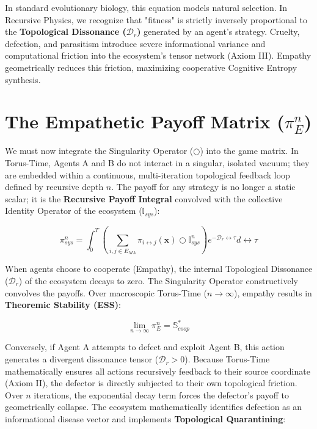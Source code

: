 \documentclass[12pt,openany]{book}
\begin{document}
In standard evolutionary biology, this equation models natural selection. In Recursive Physics, we recognize that "fitness" is strictly inversely proportional to the \textbf{Topological Dissonance ($\mathcal{D}_r$)} generated by an agent's strategy. Cruelty, defection, and parasitism introduce severe informational variance and computational friction into the ecosystem's tensor network (Axiom III). Empathy geometrically reduces this friction, maximizing cooperative Cognitive Entropy synthesis. 

\section{The Empathetic Payoff Matrix ($\pi_{E}^{n}$)}
We must now integrate the Singularity Operator ($\bigcirc$) into the game matrix. In Torus-Time, Agents A and B do not interact in a singular, isolated vacuum; they are embedded within a continuous, multi-iteration topological feedback loop defined by recursive depth $n$. The payoff for any strategy is no longer a static scalar; it is the \textbf{Recursive Payoff Integral} convolved with the collective Identity Operator of the ecosystem ($\mathbb{I}_{sys}$):

\begin{equation}
\pi_{sys}^n = \int_{0}^{T} \left( \sum_{i,j \in E_{MA}} \pi_{i \leftrightarrow j}(\mathbf{x}) \bigcirc \mathbb{I}_{sys}^n \right) e^{-\mathcal{D}_r \leftrightarrow\tau} d\leftrightarrow\tau
\end{equation}

When agents choose to cooperate (Empathy), the internal Topological Dissonance ($\mathcal{D}_r$) of the ecosystem decays to zero. The Singularity Operator constructively convolves the payoffs. Over macroscopic Torus-Time ($n \to \infty$), empathy results in \textbf{Theoremic Stability (ESS)}:

\begin{equation}
\lim_{n \to \infty} \pi_{E}^n = \mathbb{S}_{coop}^*
\end{equation}

Conversely, if Agent A attempts to defect and exploit Agent B, this action generates a divergent dissonance tensor ($\mathcal{D}_r > 0$). Because Torus-Time mathematically ensures all actions recursively feedback to their source coordinate (Axiom II), the defector is directly subjected to their own topological friction. Over $n$ iterations, the exponential decay term forces the defector's payoff to geometrically collapse. The ecosystem mathematically identifies defection as an informational disease vector and implements \textbf{Topological Quarantining}:
\end{document}
